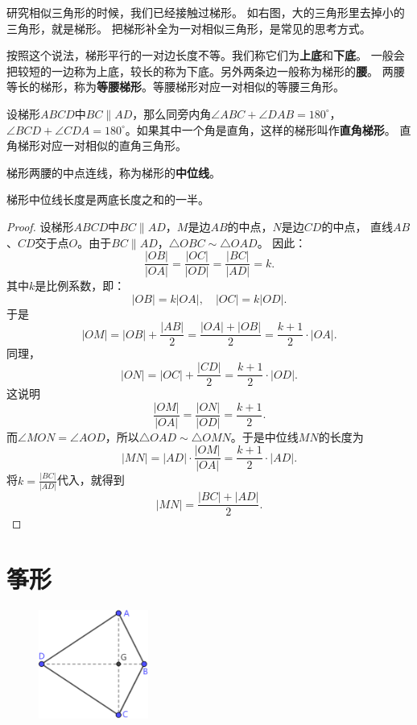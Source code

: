 \documentclass[12pt,UTF8]{ctexbook}
\begin{document}
研究相似三角形的时候，我们已经接触过梯形。
如右图，大的三角形里去掉小的三角形，就是梯形。
把梯形补全为一对相似三角形，是常见的思考方式。

按照这个说法，梯形平行的一对边长度不等。我们称它们为\textbf{上底}和\textbf{下底}。
一般会把较短的一边称为上底，较长的称为下底。另外两条边一般称为梯形的\textbf{腰}。
两腰等长的梯形，称为\textbf{等腰梯形}。等腰梯形对应一对相似的等腰三角形。

设梯形$ABCD$中$BC \parallel AD$，那么同旁内角$\angle ABC + \angle DAB = 180^\circ$，
$\angle BCD + \angle CDA = 180^\circ$。如果其中一个角是直角，这样的梯形叫作\textbf{直角梯形}。
直角梯形对应一对相似的直角三角形。

梯形两腰的中点连线，称为梯形的\textbf{中位线}。
\begin{tm}\label{tm:0-2-20}
    梯形中位线长度是两底长度之和的一半。
\end{tm}
\begin{proof}
    设梯形$ABCD$中$BC \parallel AD$，$M$是边$AB$的中点，$N$是边$CD$的中点，
    直线$AB$、$CD$交于点$O$。由于$BC \parallel AD$，$\triangle OBC \sim \triangle OAD$。
    因此：
    $$ \frac{|OB|}{|OA|} = \frac{|OC|}{|OD|} = \frac{|BC|}{|AD|} = k.$$
    其中$k$是比例系数，即：
    $$ |OB| = k|OA|, \quad |OC| = k|OD|.$$
    于是
    $$ |OM| = |OB| + \frac{|AB|}{2} = \frac{|OA| + |OB|}{2} = \frac{k+1}{2} \cdot|OA|.$$
    同理，
    $$ |ON| = |OC| + \frac{|CD|}{2} = \frac{k+1}{2}\cdot|OD|. $$
    这说明
    $$ \frac{|OM|}{|OA|} = \frac{|ON|}{|OD|} = \frac{k+1}{2}. $$
    而$\angle MON = \angle AOD$，所以$\triangle OAD \sim \triangle OMN$。于是中位线$MN$的长度为
    $$ |MN| = |AD| \cdot \frac{|OM|}{|OA|} = \frac{k+1}{2}\cdot|AD|. $$
    将$k = \frac{|BC|}{|AD|}$代入，就得到
    $$ |MN| = \frac{|BC| + |AD|}{2}. $$
\end{proof}

\section{筝形}

\begin{figure} %
    \vspace{-5pt}
    \centering
    \includegraphics[width=0.32\textwidth]{tu/筝形1.png}
\end{figure}
\end{document}
